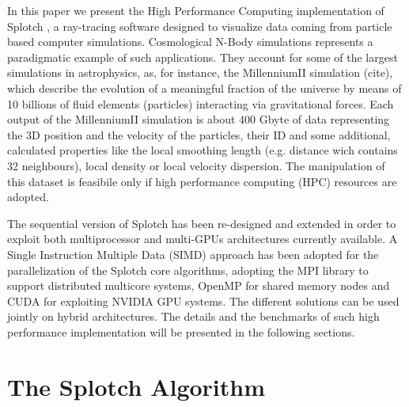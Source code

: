 In this paper we present the High Performance Computing implementation of
Splotch \citep{2008NJPh...10l5006D}, a ray-tracing software designed to visualize data coming from particle 
based computer simulations. Cosmological N-Body simulations represents a paradigmatic
example of such applications. They account for some of the largest simulations in astrophysics, 
as, for instance, the MillenniumII simulation (cite), which describe the evolution 
of a meaningful fraction of the universe by means of 10 billions of fluid elements
(particles) interacting via gravitational forces. Each output of the MillenniumII 
\citep{2009MNRAS.398.1150B} simulation is about 400 Gbyte of data representing the 
3D position and the velocity of the particles, their ID and some additional, calculated
properties like the local smoothing length (e.g. distance wich contains 32 neighbours),
local density or local velocity dispersion. The manipulation of this dataset is feasibile 
only if high performance computing (HPC) resources are adopted. 

The sequential version of Splotch \citep{2008NJPh...10l5006D} has been re-designed and extended in order
to exploit both multiprocessor and multi-GPUs architectures currently available. 
A Single Instruction Multiple Data (SIMD) approach has been adopted for the parallelization
of the Splotch core algorithms, adopting the MPI library to support distributed multicore systems, 
OpenMP for shared memory nodes and CUDA for exploiting NVIDIA GPU systems. The different 
solutions can be used jointly on hybrid architectures. The details and
the benchmarks of such high performance implementation will be presented in the following sections.  


\section{The Splotch Algorithm}
\label{splotch}

